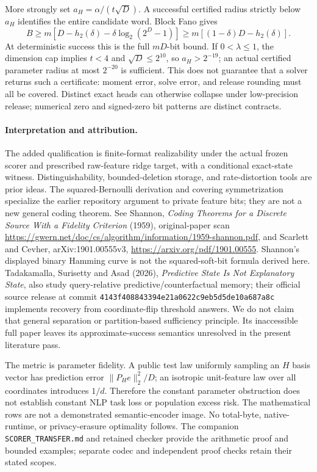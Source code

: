 More strongly set $a_H=\alpha/(t\sqrt D)$.  A successful certified radius
strictly below $a_H$ identifies the entire candidate word.  Block Fano gives
\[
 B\ge m\left[D-h_2(\delta)-\delta\log_2(2^D-1)\right]
 \ge m\left[(1-\delta)D-h_2(\delta)\right].
\]
At deterministic success this is the full $mD$-bit bound.  If
$0<\lambda\le1$, the dimension cap implies $t<4$ and $\sqrt D\le2^{10}$,
so $a_H>2^{-19}$; an actual certified parameter radius at most $2^{-20}$ is
sufficient.  This does not guarantee that a solver returns such a
certificate: moment error, solve error, and release rounding must all be
covered.  Distinct exact heads can otherwise collapse under low-precision
release; numerical zero and signed-zero bit patterns are distinct contracts.

\paragraph{Interpretation and attribution.}
The added qualification is finite-format realizability under the actual
frozen scorer and prescribed raw-feature ridge target, with a conditional
exact-state witness.  Distinguishability, bounded-deletion storage, and
rate-distortion tools are prior ideas.  The squared-Bernoulli derivation and
covering symmetrization specialize the earlier repository argument to
private feature bits; they are not a new general coding theorem.  See
Shannon, \emph{Coding Theorems for a Discrete Source With a Fidelity
Criterion} (1959), original-paper scan
\url{https://gwern.net/doc/cs/algorithm/information/1959-shannon.pdf},
and Scarlett and Cevher, arXiv:1901.00555v3,
\url{https://arxiv.org/pdf/1901.00555}.
Shannon's displayed binary Hamming curve is not the squared-soft-bit
formula derived here.  Tadakamalla, Surisetty and Asad (2026),
\emph{Predictive State Is Not Explanatory State}, also study query-relative
predictive/counterfactual memory; their official source release at commit
\texttt{4143f408843394e21a0622c9eb5d5de10a687a8c} implements recovery from
coordinate-flip threshold answers.  We do not claim that general
separation or partition-based sufficiency principle.  Its inaccessible
full paper leaves its approximate-success semantics unresolved in the
present literature pass.

The metric is parameter fidelity.  A public test law uniformly sampling
an $H$ basis vector has prediction error $\|P_H e\|_2^2/D$; an isotropic
unit-feature law over all coordinates introduces $1/d$.  Therefore the
constant parameter obstruction does not establish constant NLP task loss
or population excess risk.  The mathematical rows are not a demonstrated
semantic-encoder image.  No total-byte, native-runtime, or privacy-erasure
optimality follows.  The companion \texttt{SCORER\_TRANSFER.md} and retained
checker provide the arithmetic proof and bounded examples; separate codec
and independent proof checks retain their stated scopes.
